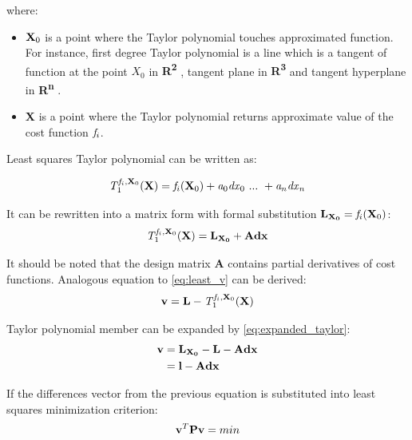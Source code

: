 \documentclass[a4paper,12pt]{article}
\newcommand{\ematr}[1]{%
{\bf #1}%
}
\newcommand{\evect}[1]{%
{\bf #1}%
}
\newcommand{\escal}[1]{%
{\it #1}%
}
\newcommand{\eucl}[1]{%
{\bf R\textsuperscript{#1}}%
}
\newcommand{\efunc}[1]{%
{\it #1}%
}
\begin{document}

\noindent where:
\begin{itemize}
\item $\evect{X}_{0}$ is a point where the Taylor polynomial touches approximated function. 
      For instance, first degree Taylor polynomial 
      is a line which is a tangent of function at the point $X_{0}$ in \eucl{2}, tangent plane in \eucl{3} and  
       tangent hyperplane in  \eucl{n}.
\item \evect{X} is a point where the Taylor polynomial returns approximate value of the cost function $\efunc{f}_{i}$.
\end{itemize}

Least squares Taylor polynomial can be written as:

\begin{equation}
\efunc{T} ^{\efunc{f}_{i}, \evect{X}_{0}}_{1} (\evect{X}) =  \efunc{f}_{i}(\evect{X}_{0}) + \escal{a}_{0} \escal{dx}_{0} \ ... \ + \escal{a}_{n} \escal{dx}_{n} 
\end{equation} 

It can be rewritten into a matrix form with formal substitution $\evect{L_{X_{0}}} = \efunc{f}_{i}(\evect{X}_{0})$:
\begin{equation}
\label{eq:expanded_taylor}
\efunc{T} ^{\efunc{f}_{i}, \evect{X}_{0}}_{1} (\evect{X}) = \evect{L_{X_{0}}} + \ematr{A}\evect{dx}
\end{equation} 

It should be noted that the design matrix \ematr{A} contains partial derivatives of cost functions. 
Analogous equation to \eqref{eq:least_v} can be derived:
\begin{equation}
\evect{v} = \evect{L} - \efunc{T} ^{\efunc{f}_{i}, \evect{X}_{0}}_{1} (\evect{X})
\end{equation} 
 
Taylor polynomial member can be expanded by \eqref{eq:expanded_taylor}:
\begin{equation}
\begin{split}
\evect{v} &=  \evect{L_{X_{0}}} - \evect{L} - \ematr{A}\evect{dx} \\
          &= \evect{l} - \ematr{A}\evect{dx}
\end{split}
\end{equation}

If the differences vector from the previous equation is substituted into least squares minimization criterion:
\begin{equation}
\label{eq:min_cond}
\evect{v}^{T}  \ematr{P} \evect{v} = min
\end{equation}
\end{document}
